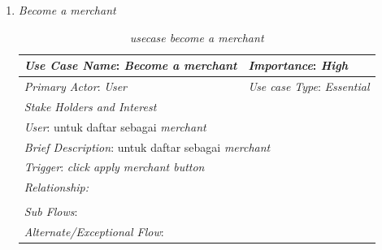 \documentclass[a4paper]{article}
\begin{document}
\begin{enumerate}
\begin{enumerate}
        \item \textit{Become a merchant}
\begin{table}[h]
    \centering
    \begin{tabular}{|lll}
    \hline
    \multicolumn{1}{|l|}{\textit{Use Case Name}: \textit{Become a merchant}}             & \multicolumn{2}{l|}{\textit{Importance}: \textit{High}}   \\ \hline
    \multicolumn{1}{|l|}{\textit{Primary Actor}: \textit{User}}             & \multicolumn{2}{l|}{\textit{Use case Type}: \textit{Essential}} \\ \hline
    \multicolumn{1}{|l|}{\textit{Stake Holders and Interest}} &                               &                               \\ \cline{1-1}
    \multicolumn{1}{|l|}{\textit{User}: untuk daftar sebagai \textit{merchant}}                                                     &                               &                               \\ \hline
    \multicolumn{3}{|l|}{\textit{Brief Description}: untuk daftar sebagai \textit{merchant}}                                                                         \\ \hline
    \multicolumn{3}{|l|}{\textit{Trigger}: \textit{click apply merchant button}}                                                                                   \\ \hline
    \multicolumn{3}{|l|}{\textit{Relationship:}}                                                                              \\ \hline
    \multicolumn{3}{|l|}{}                                                                                                                     \\ \hline
    \multicolumn{3}{|l|}{\textit{Sub Flows}:}                                                                                 \\ \hline
    \multicolumn{3}{|l|}{\textit{Alternate/Exceptional Flow}:}                                                                \\ \hline
    \end{tabular}
    \caption{\textit{usecase become a merchant} }
\end{table}

        \newpage


\end{enumerate}
\end{enumerate}
\end{document}
